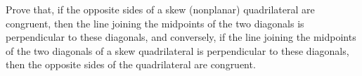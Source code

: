 Prove that, if the opposite sides of a skew (nonplanar) quadrilateral are congruent, then the line joining the midpoints of the two diagonals is perpendicular to these diagonals, and conversely, if the line joining the midpoints of the two diagonals of a skew quadrilateral is perpendicular to these diagonals, then the opposite sides of the quadrilateral are congruent.
